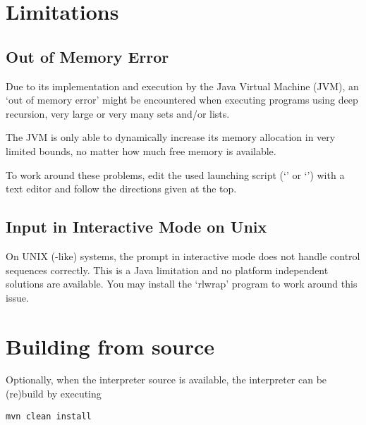 \section{Limitations}

\subsection{Out of Memory Error}

Due to its implementation and execution by the Java Virtual Machine (JVM), an `out of memory error' might be encountered when executing \SetlX{} programs using deep recursion, very large or very many sets and\slash{}or lists.

The JVM is only able to dynamically increase its memory allocation in very limited bounds, no matter how much free memory is available.

To work around these problems, edit the used launching script (`' or `') with a text editor and follow the directions given at the top.

\subsection{Input in Interactive Mode on Unix}\label{LimitationsInteractiveMode}

On UNIX (-like) systems, the prompt in interactive mode does not handle control sequences correctly. This is a Java limitation and no platform independent solutions are available. You may install the `rlwrap' program to work around this issue.

%

\section{Building from source}

Optionally, when the interpreter source is available, the interpreter can be (re)build by executing

\begin{lstlisting}[frame=none,numbers=none]
mvn clean install
\end{lstlisting}

